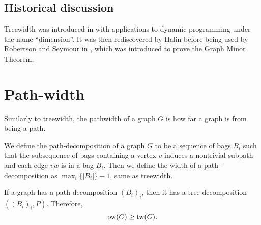 \subsection{Historical discussion}\label{ssec:tw_historical}
Treewidth was introduced in \cite{berteleChapterEliminationVariables1972} with applications to dynamic programming under the name ``dimension''. It was then rediscovered by Halin \cite{halinSfunctionsGraphs1976} before being used by Robertson and Seymour in \cite{robertsonGraphMinorsIII1984}, which was introduced to prove the Graph Minor Theorem\cite{robertsonGraphMinorsXX2004}.


\section{Path-width}\label{sec:Pathwidth}
Similarly to treewidth, the pathwidth of a graph $G$ is how far a graph is from being a path. 

We define the path-decomposition of a graph $G$ to be a sequence of bags $B_i$ such that the subsequence of bags containing a vertex $v$ induces a nontrivial subpath and each edge $vw$ is in a bag $B_i$. Then we define the width of a path-decomposition as $\max_i \lbrace |B_i| \rbrace -1$, same as treewidth.

If a graph has a path-decomposition $(B_i)_i$, then it has a tree-decomposition $\left((B_i)_i, P\right)$. Therefore,
\begin{equation}
	\text{pw}(G) \geq \text{tw}(G).
\end{equation}


